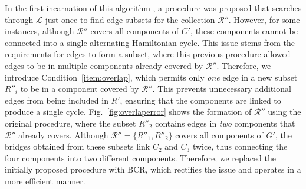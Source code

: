 \documentclass[a4paper,11pt,authoryear]{elsarticle}
\newcommand{\chng}[1]{{\color{myRed}#1}}
\begin{document}
\noindent In the first incarnation of this algorithm \citep{becker2010}, a procedure was proposed that searches through $\mathcal{L}$ just once to find edge subsets for the collection $\mathcal{R}''$. However, for some instances, although $\mathcal{R}''$ covers all components of $G'$\chng{,} these components cannot be connected into a single alternating Hamiltonian cycle. This issue stems from the requirements for edges to form a subset, where this previous procedure allowed edges to be in multiple components already covered by $\mathcal{R}''$. Therefore, we introduce Condition~\ref{item:overlap}, which permits only \emph{one} edge in a new subset $R''_i$ to be in a component covered by $\mathcal{R}''$. This prevents unnecessary additional edges from being included in $R'$, ensuring that the components are linked to produce a single cycle. Fig.~\ref{fig:overlaperror} shows the formation of $\mathcal{R}''$ using the original procedure, where the subset $R''_2$ contains edges in \emph{two} components that $\mathcal{R}''$ already covers. Although $\mathcal{R}'' = \{R''_1, R''_2\}$ covers all components of $G'$, the bridges obtained from these subsets link $C_2$ and $C_3$ twice, thus connecting the four components into two different components. Therefore, we replaced the initially proposed procedure with BCR, which rectifies the issue and operates in a more efficient manner.

\end{document}
